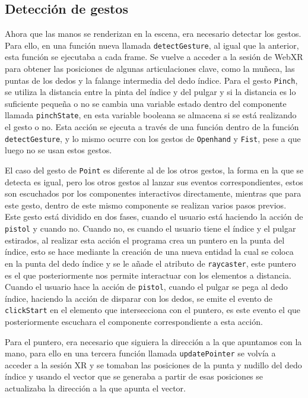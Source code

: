 \documentclass[a4paper, 12pt]{book}
\begin{document}
\subsection{Detección de gestos}
\label{subsec:deteccion-gestos}
Ahora que las manos se renderizan en la escena, era necesario detectar los gestos. Para ello, en una función nueva llamada \texttt{detectGesture}, al igual que la anterior, esta función se ejecutaba a cada frame. Se vuelve a acceder a la sesión de WebXR para obtener las posiciones de algunas articulaciones clave, como la muñeca, las puntas de los dedos y la falange intermedia del dedo índice.
Para el gesto \texttt{Pinch}, se utiliza la distancia entre la pinta del índice y del pulgar y si la distancia es lo suficiente pequeña o no se cambia una variable estado dentro del componente llamada \texttt{pinchState}, en esta variable booleana se almacena si se está realizando el gesto o no. Esta acción se ejecuta a través de una función dentro de la función \texttt{detectGesture}, y lo mismo ocurre con los gestos de \texttt{Openhand} y \texttt{Fist}, pese a que luego no se usan estos gestos. 

El caso del gesto de \texttt{Point} es diferente al de los otros gestos, la forma en la que se detecta es igual, pero los otros gestos al lanzar sus eventos correspondientes, estos son escuchados por los componentes interactivos directamente, mientras que para este gesto,
dentro de este mismo componente se realizan varios pasos previos. Este gesto está dividido en dos fases, cuando el usuario está haciendo la acción de \texttt{pistol} y cuando no. Cuando no, es cuando el usuario tiene el índice y el pulgar estirados, al realizar esta acción el programa crea un puntero en la punta del índice, esto se hace mediante la creación de una nueva entidad la cual se coloca en la punta del dedo índice y se le añade el atributo de \texttt{raycaster}, este puntero es el que posteriormente nos permite interactuar con los elementos a distancia. Cuando el usuario hace la acción de \texttt{pistol}, cuando el pulgar se pega al dedo índice, haciendo la acción de disparar con los dedos, se emite el evento de \texttt{clickStart} en el elemento que intersecciona con el puntero, es este evento el que posteriormente escuchara el componente correspondiente a esta acción. 

Para el puntero, era necesario que siguiera la dirección a la que apuntamos con la mano, para ello en una tercera función llamada \texttt{updatePointer} se volvía a acceder a la sesión XR y se tomaban las posiciones de la punta y nudillo del dedo índice y usando el vector que se generaba a partir de esas posiciones se actualizaba la dirección a la que apunta el vector.
\end{document}
